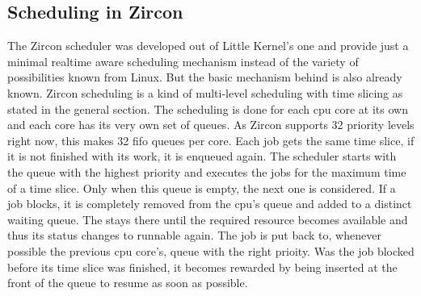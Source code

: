 \subsection{Scheduling in Zircon}
The Zircon scheduler was developed out of Little Kernel's one and provide just a minimal realtime aware scheduling mechanism instead of the variety of possibilities known from Linux.
But the basic mechanism behind is also already known.
Zircon scheduling is a kind of multi-level scheduling with time slicing as stated in the general section.
The scheduling is done for each \ac{cpu} core at its own and each core has its very own set of queues.
As Zircon supports 32 priority levels right now, this makes 32 \ac{fifo} queues per core\cite{zircon-scheduling}.
Each job gets the same time slice, if it is not finished with its work, it is enqueued again.
The scheduler starts with the queue with the highest priority and executes the jobs for the maximum time of a time slice.
Only when this queue is empty, the next one is considered.
If a job blocks, it is completely removed from the \ac{cpu}'s queue and added to a distinct waiting queue.
The stays there until the required resource becomes available and thus its status changes to runnable again.
The job is put back to, whenever possible the previous \ac{cpu} core's, queue with the right prioity.
Was the job blocked before its time slice was finished, it becomes rewarded by being inserted at the front of the queue to resume as soon as possible\cite{zircon-scheduling}.

